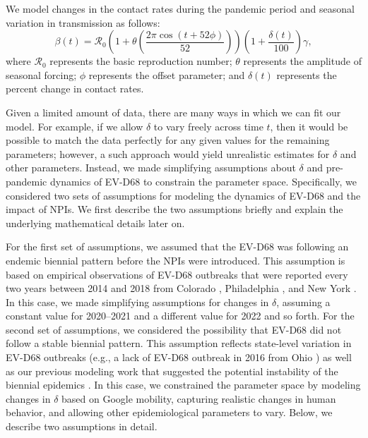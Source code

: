 \documentclass[12pt]{article}
\begin{document}
We model changes in the contact rates during the pandemic period and seasonal variation in transmission as follows:
\begin{equation}
\beta(t) = \mathcal R_0 \left(1 + \theta \left(\frac{2 \pi \cos(t + 52 \phi)}{52} \right) \right) \left(1 + \frac{\delta(t)}{100} \right) \gamma,
\end{equation}
where $\mathcal R_0$ represents the basic reproduction number;
$\theta$ represents the amplitude of seasonal forcing;
$\phi$ represents the offset parameter;
and $\delta(t)$ represents the percent change in contact rates.

Given a limited amount of data, there are many ways in which we can fit our model.
For example, if we allow $\delta$ to vary freely across time $t$, then it would be possible to match the data perfectly for any given values for the remaining parameters;
however, a such approach would yield unrealistic estimates for $\delta$ and other parameters.
Instead, we made simplifying assumptions about $\delta$ and pre-pandemic dynamics of EV-D68 to constrain the parameter space.
Specifically, we considered two sets of assumptions for modeling the dynamics of EV-D68 and the impact of NPIs.
We first describe the two assumptions briefly and explain the underlying mathematical details later on.

For the first set of assumptions, we assumed that the EV-D68 was following an endemic biennial pattern before the NPIs were introduced.
This assumption is based on empirical observations of EV-D68 outbreaks that were reported every two years between 2014 and 2018 from Colorado \citep{messacar2019continued}, Philadelphia \citep{uprety2019association}, and New York \citep{gilrane2020biennial}.
In this case, we made simplifying assumptions for changes in $\delta$, assuming a constant value for 2020--2021 and a different value for 2022 and so forth.
For the second set of assumptions, we considered the possibility that EV-D68 did not follow a stable biennial pattern.
This assumption reflects state-level variation in EV-D68 outbreaks (e.g., a lack of EV-D68 outbreak in 2016 from Ohio \citep{wang2019molecular}) as well as our previous modeling work that suggested the potential instability of the biennial epidemics \citep{park2021epidemiological}.
In this case, we constrained the parameter space by modeling changes in $\delta$ based on Google mobility, capturing realistic changes in human behavior, and allowing other epidemiological parameters to vary.
Below, we describe two assumptions in detail.
\end{document}
